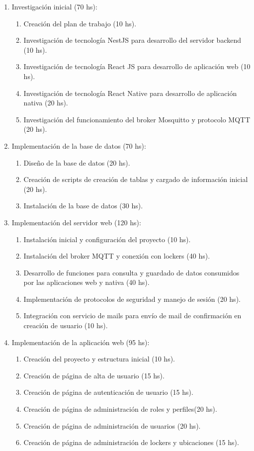 \documentclass[
11pt, %
]{charter}
\begin{document}
\begin{enumerate}
\item Investigación inicial (70 hs):
	\begin{enumerate}
	\item Creación del plan de trabajo (10 hs).
	\item Investigación de tecnología NestJS para desarrollo del servidor backend (10 hs).
	\item Investigación de tecnología React JS para desarrollo de aplicación web (10 hs).
	\item Investigación de tecnología React Native para desarrollo de aplicación nativa (20 hs).
	\item Investigación del funcionamiento del broker Mosquitto y protocolo MQTT (20 hs).
	\end{enumerate}
\item Implementación de la base de datos (70 hs):
	\begin{enumerate}
	\item Diseño de la base de datos (20 hs).
	\item Creación de scripts de creación de tablas y cargado de información inicial (20 hs).
	\item Instalación de la base de datos (30 hs).
	\end{enumerate}
\item Implementación del servidor web (120 hs):
	\begin{enumerate}
	\item Instalación inicial y configuración del proyecto (10 hs).
	\item Instalación del broker MQTT y conexión con lockers (40 hs).
	\item Desarrollo de funciones para consulta y guardado de datos consumidos por las aplicaciones web y nativa (40 hs).
	\item Implementación de protocolos de seguridad y manejo de sesión (20 hs).
	\item Integración con servicio de mails para envío de mail de confirmación en creación de usuario (10 hs).
	\end{enumerate}
	
\item Implementación de la aplicación web (95 hs):
	\begin{enumerate}
	\item Creación del proyecto y estructura inicial (10 hs).
	\item Creación de página de alta de usuario (15 hs).
	\item Creación de página de autenticación de usuario (15 hs).
	\item Creación de página de administración de roles y perfiles(20 hs).	
	\item Creación de página de administración de usuarios (20 hs).
	\item Creación de página de administración de lockers y ubicaciones (15 hs).
	\end{enumerate}
	

\end{enumerate}
\end{document}
